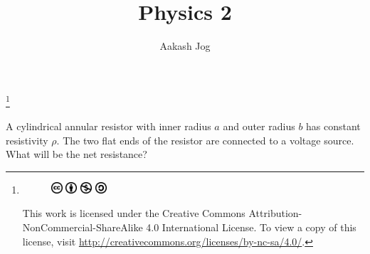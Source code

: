 \documentclass[fleqn, a4paper, 12pt, twoside]{article}
\title{Physics 2}
\author{Aakash Jog}
\date{\formatdate{24}{6}{2015}}
\theoremstyle{definition}
\theoremstyle{theorem}
\newcommand\blfootnote[1]{%
	\begingroup
	\renewcommand\thefootnote{}\footnote{#1}%
	\addtocounter{footnote}{-1}%
	\endgroup
}
\begin{document}
\maketitle

\blfootnote
{	
	\begin{figure}[H]
		\includegraphics[height = 12pt]{cc.eps}
		\includegraphics[height = 12pt]{by.eps}
		\includegraphics[height = 12pt]{nc.eps}
		\includegraphics[height = 12pt]{sa.eps}
	\end{figure}
	This work is licensed under the Creative Commons Attribution-NonCommercial-ShareAlike 4.0 International License. To view a copy of this license, visit \url{http://creativecommons.org/licenses/by-nc-sa/4.0/}.
} %

\begin{question}
	\begin{figure}[H]
	\end{figure}
	A cylindrical annular resistor with inner radius $a$ and outer radius $b$ has constant resistivity $\rho$.
	The two flat ends of the resistor are connected to a voltage source.
	What will be the net resistance?
\end{question}
\end{document}
